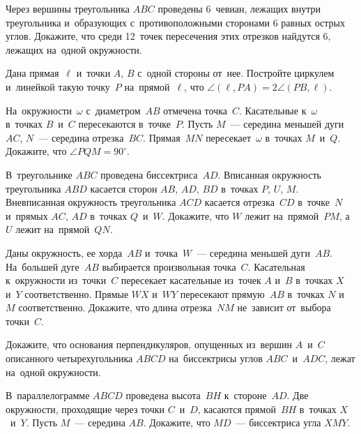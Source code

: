 


\begin{problems}


\item
Через вершины треугольника $ABC$ проведены 6~чевиан, лежащих внутри
треугольника и~образующих с~противоположными сторонами 6 равных острых углов.
Докажите, что среди 12~точек пересечения этих отрезков найдутся 6, лежащих
на~одной окружности.

\item
Дана прямая~$\ell$ и~точки $A$, $B$ с~одной стороны от~нее.
Постройте циркулем и~линейкой такую точку~$P$ на~прямой~$\ell$, что
$\angle(\ell, PA) = 2 \angle(PB, \ell)$.

\item
На~окружности~$\omega$ с~диаметром~$AB$ отмечена точка~$C$.
Касательные к~$\omega$ в~точках $B$~и~$C$ пересекаются в~точке~$P$.
Пусть $M$~--- середина меньшей дуги~$AC$, $N$~--- середина отрезка~$BC$.
Прямая~$MN$ пересекает~$\omega$ в~точках $M$~и~$Q$.
Докажите, что $\angle PQM = 90^{\circ}$.

\item
В~треугольнике $ABC$ проведена биссектриса~$AD$.
Вписанная окружность треугольника $ABD$ касается сторон $AB$, $AD$, $BD$
в~точках $P$, $U$, $M$.
Вневписанная окружность треугольника $ACD$ касается отрезка~$CD$ в~точке~$N$
и~прямых $AC$, $AD$ в~точках $Q$~и~$W$.
Докажите, что $W$ лежит на~прямой~$PM$, а~$U$ лежит на~прямой~$QN$.

\item
Даны окружность, ее хорда~$AB$ и~точка~$W$~--- середина меньшей дуги~$AB$.
На~большей дуге~$AB$ выбирается произвольная точка~$C$.
Касательная к~окружности из~точки~$C$ пересекает касательные из~точек $A$ и~$B$
в~точках $X$ и~$Y$ соответственно.
Прямые $WX$ и~$WY$ пересекают прямую~$AB$ в~точках $N$ и~$M$ соответственно.
Докажите, что длина отрезка~$NM$ не~зависит от~выбора точки~$C$.

\item
Докажите, что основания перпендикуляров, опущенных из~вершин $A$~и~$C$
описанного четырехугольника $ABCD$ на~биссектрисы углов $ABC$~и~$ADC$, лежат
на~одной окружности.

\item
В~параллелограмме $ABCD$ проведена высота~$BH$ к~стороне~$AD$.
Две окружности, проходящие через точки $C$~и~$D$, касаются прямой~$BH$ в~точках
$X$~и~$Y$.
Пусть $M$~--- середина $AB$.
Докажите, что $MD$~--- биссектриса угла $XMY$.

\end{problems}

